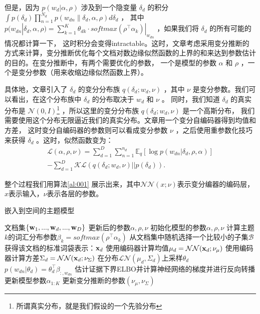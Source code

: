 \documentclass[twocolumn]{article}
\begin{document}
    但是，因为 $ p(w_d | \alpha, \rho) $ 涉及到一个隐变量 $ \delta_d $ 的积分 $ \int p(\delta_d)\prod_{n=1}^{N_d}p(w_{dn}\| \delta_d,\alpha,\rho)d\delta_d $ ， 
    其中$ p(w_{dn}|\delta_d,\alpha,\rho) = \sum_{k=1}^{K}\theta_{dk}\cdot softmax(\rho^\top\alpha_k)|_{w_{dn}} $ ，如果我们将 $ \delta_d $ 的所有可能的情况都计算一下，
    这时积分会变得intractable。这时，文章考虑采用变分推断的方式来计算，变分推断优化每个文档对数边缘似然函数的上界的和来达到参数估计的目的。在变分推断中，有两个需要优化的参数，
    一个是模型的参数 $ \alpha $ 和 $ \rho $  ，一个是变分参数（用来收缩边缘似然函数上界）。
    
    具体地，文章引入了 $ \delta_d $ 的变分分布族 $ q(\delta_d;w_d,\nu) $ ，其中 $ \nu $ 是变分参数。我们可以看出，在这个分布族中 $ \delta_d $ 的分布取决于 $ w_d $ 和 $ \nu $ 。
    同时，我们知道 $ \delta_d $ 的真实分布是 $ \mathcal{N}(0, I) $\footnote{所谓真实分布，就是我们假设的一个先验分布} ，所以这里的变分分布族 $ q(\delta_d;w_d,\nu) $ 是一个高斯分布， 
    我们需要使用这个分布无限逼近我们的真实分布。文章用一个变分自编码器得到均值和方差，
    这时变分自编码器的参数则可以看成变分参数 $ \nu $ ，之后使用重参数化技巧来获得 $ \delta_d $ 。这时，似然函数变为：
\begin{equation}
    \begin{aligned}
        \mathcal{L}(\alpha,\rho,\nu) = \sum_{d=1}^{D}\sum_{n=1}^{n_d}\mathbb{E}_q[\log p(w_{dn}|\delta_d,\rho,\alpha)] \\ 
         - \sum_{d=1}^{D}\mathcal{KL} \left( q(\delta_d;w_d,\nu)||p(\delta_d) \right)  .
        \label{eq:002}
    \end{aligned}
\end{equation}

    整个过程我们用算法\ref{al:001} 展示出来，其中$ \mathcal{NN}(x;\nu) $表示变分编器的编码层，$ x $表示输入，$ \nu $表示各层的参数。
\begin{algorithm}
    \caption{嵌入到空间的主题模型}
    \begin{algorithmic}[1] %
        \Require 文档集$ \{ {{\bf{w}}_1},...,{{\bf{w}}_d},...,{{\bf{w}}_D} \} $
        \Ensure 更新后的参数$\alpha, \rho, \nu$
        \State 初始化模型的参数$\alpha, \rho, \nu$
        \State 计算主题$ k $的词汇分布参数$ \beta_k = softmax(\rho^\top\alpha_k)$
        \State 从文档集中随机选择一个比较小的子集$ \mathcal{B} $
        \State 获得该文档的标准词袋表示：$ {\bf{x}}_d $
        \State 使用编码器计算均值$ \mu_d = \mathcal{NN}({\bf{x}}_d; \nu_\mu) $
        \State 使用编码器计算方差$ \Sigma_d = \mathcal{NN}({\bf{x}}_d; \nu_\Sigma) $
        \State 在分布$ \mathcal{LN}(\mu_d, \Sigma_d) $上采样$ \theta_d $
        \State  $ p(w_{dn}|\theta_d) = \theta_d^\top\beta_{:,w_{dn}} $
        \EndFor
        \EndFor
        \State 估计证据下界ELBO并计算神经网络的梯度并进行反向转播
        \State 更新模型参数$ \alpha_{1:K} $
        \State 更新变分推断的参数$ (\nu_\mu, \nu_\Sigma) $
        \EndFor
    \end{algorithmic}
    \label{al:001}
\end{algorithm}
    
\end{document}
